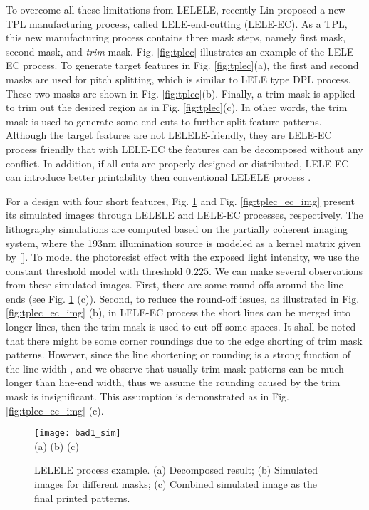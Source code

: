 \documentclass[12pt]{spieman}
\theoremstyle{plain}
\begin{document}
\begin{spacing}{1}
To overcome all these limitations from LELELE, recently Lin \cite{LITH_ISPD2012_Lin} proposed a new TPL manufacturing process, called LELE-end-cutting (LELE-EC).
As a TPL, this new manufacturing process contains three mask steps, namely first mask, second mask, and \textit{trim} mask.
Fig. \ref{fig:tplec} illustrates an example of the LELE-EC process.
To generate target features in Fig. \ref{fig:tplec}(a), the first and second masks are used for pitch splitting,
which is similar to LELE type DPL process.
These two masks are shown in Fig. \ref{fig:tplec}(b).
Finally, a trim mask is applied to trim out the desired region as in Fig. \ref{fig:tplec}(c).
In other words, the trim mask is used to generate some end-cuts to further split feature patterns.
Although the target features are not LELELE-friendly, they are LELE-EC process friendly that with LELE-EC the features can be decomposed without any conflict.
In addition, if all cuts are properly designed or distributed, LELE-EC can introduce better printability then conventional LELELE process \cite{LITH_ISPD2012_Lin}.

For a design with four short features, Fig. \ref{fig:tplec_le3_img} and Fig. \ref{fig:tplec_ec_img} present its simulated images through LELELE and LELE-EC processes, respectively.
The lithography simulations are computed based on the partially coherent imaging system, where the 193nm illumination source is modeled as a kernel matrix given by [].
To model the photoresist effect with the exposed light intensity, we use the constant threshold model with threshold $0.225$.
We can make several observations from these simulated images.
First, there are some round-offs around the line ends (see Fig. \ref{fig:tplec_le3_img} (c)).
Second, to reduce the round-off issues, as illustrated in Fig. \ref{fig:tplec_ec_img} (b), in LELE-EC process the short lines can be merged into longer lines,
then the trim mask is used to cut off some spaces.
It shall be noted that there might be some corner roundings due to the edge shorting of trim mask patterns.
However, since the line shortening or rounding is a strong function of the line width \cite{LITH_Book08_Mack},
and we observe that usually trim mask patterns can be much longer than line-end width,
thus we assume the rounding caused by the trim mask is insignificant.
This assumption is demonstrated as in Fig. \ref{fig:tplec_ec_img} (c).

\begin{figure}[tb]
  \centering
  \texttt{[image: bad1\_sim]}
  \\ (a) \hspace{3.8cm} (b) \hspace{3.8cm} (c)
  \caption{LELELE process example.
  (a) Decomposed result;
  (b) Simulated images for different masks;
  (c) Combined simulated image as the final printed patterns.
  }
  \label{fig:tplec_le3_img}
\end{figure}


\end{spacing}
\end{document}
